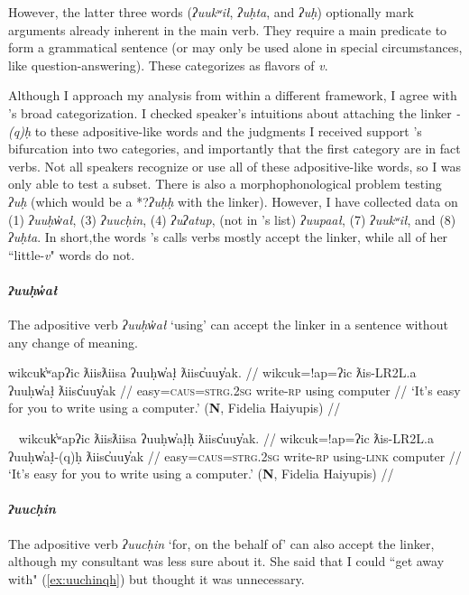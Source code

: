 However, the  latter three words (\textit{ʔuukʷił}, \textit{ʔuḥta}, and \textit{ʔuḥ}) optionally mark arguments already inherent in the main verb. They require a main predicate to form a grammatical sentence (or may only be used alone in special circumstances, like question-answering). These \citeauthor{woo2007b} categorizes as flavors of \textit{v}.

Although I approach my analysis from within a different framework, I agree with \citeauthor{woo2007b}'s broad categorization. I checked speaker's intuitions about attaching the linker \textit{-(q)ḥ} to these adpositive-like words and the judgments I received support \citeauthor{woo2007b}'s bifurcation into two categories, and importantly that the first category are in fact verbs. Not all speakers recognize or use all of these adpositive-like words, so I was only able to test a subset. There is also a morphophonological problem testing \textit{ʔuḥ} (which would be a *?\textit{ʔuḥḥ} with the linker). However, I have collected data on (1) \textit{ʔuuḥw̓ał}, (3) \textit{ʔuucḥin}, (4) \textit{ʔuʔatup}, (not in \citeauthor{woo2007b}'s list) \textit{ʔuupaał}, (7) \textit{ʔuukʷił}, and (8) \textit{ʔuḥta}. In short,the words \citeauthor{woo2007b}'s calls verbs mostly accept the linker, while all of her ``little-\textit{v}" words do not.

\paragraph{\textit{ʔuuḥw̓ał}} \label{sec:link:uuhwal} The adpositive verb \textit{ʔuuḥw̓ał} `using' can accept the linker in a sentence without any change of meaning.

\ex \label{ex:uuhwal}
\begingl
\glpreamble wikcuk̓ʷapʔic ƛiisƛiisa ʔuuḥw̓ał̣ ƛiisc̓uuy̓ak. //
\gla wikcuk=!ap=ʔic ƛis-LR2L.a ʔuuḥw̓ał̣ ƛiisc̓uuy̓ak //
\glb easy=\textsc{caus}=\textsc{strg.2sg} write-\textsc{rp} using computer //
\glft `It's easy for you to write using a computer.' (\textbf{N}, Fidelia Haiyupis) //
\endgl
\xe

\ex~ \label{ex:uuhwalh}
\begingl
\glpreamble wikcuk̓ʷapʔic ƛiisƛiisa ʔuuḥw̓ał̣ḥ ƛiisc̓uuy̓ak. //
\gla wikcuk=!ap=ʔic ƛis-LR2L.a ʔuuḥw̓ał̣-(q)ḥ ƛiisc̓uuy̓ak //
\glb easy=\textsc{caus}=\textsc{strg.2sg} write-\textsc{rp} using-\textsc{link} computer //
\glft `It's easy for you to write using a computer.' (\textbf{N}, Fidelia Haiyupis) //
\endgl
\xe

\paragraph{\textit{ʔuucḥin}} \label{sec:link:uuchin} The adpositive verb \textit{ʔuucḥin} `for, on the behalf of' can also accept the linker, although my consultant was less sure about it. She said that I could ``get away with" (\ref{ex:uuchinqh}) but thought it was unnecessary.

